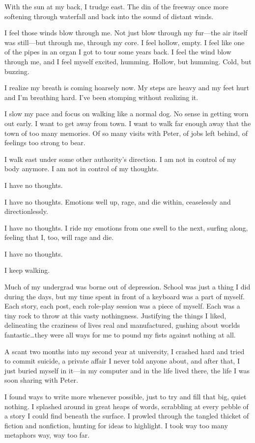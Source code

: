 With the sun at my back, I trudge east. The din of the freeway once more softening through waterfall and back into the sound of distant winds.

I feel those winds blow through me. Not just blow through my fur---the air itself was still---but through me, through my core. I feel hollow, empty. I feel like one of the pipes in an organ I got to tour some years back. I feel the wind blow through me, and I feel myself excited, humming. Hollow, but humming. Cold, but buzzing.

I realize my breath is coming hoarsely now. My steps are heavy and my feet hurt and I'm breathing hard. I've been stomping without realizing it.

I slow my pace and focus on walking like a normal dog. No sense in getting worn out early. I want to get away from town. I want to walk far enough away that the town of too many memories. Of so many visits with Peter, of jobs left behind, of feelings too strong to bear.

I walk east under some other authority's direction. I am not in control of my body anymore. I am not in control of my thoughts.

I have no thoughts.

I have no thoughts. Emotions well up, rage, and die within, ceaselessly and directionlessly.

I have no thoughts. I ride my emotions from one swell to the next, surfing along, feeling that I, too, will rage and die.

I have no thoughts.

I keep walking.

\secdiv{}

\noindent Much of my undergrad was borne out of depression. School was just a thing I did during the days, but my time spent in front of a keyboard was a part of myself. Each story, each post, each role-play session was a piece of myself. Each was a tiny rock to throw at this vasty nothingness. Justifying the things I liked, delineating the craziness of lives real and manufactured, gushing about worlds fantastic\ldots{}they were all ways for me to pound my fists against nothing at all.

A scant two months into my second year at university, I crashed hard and tried to commit suicide, a private affair I never told anyone about, and after that, I just buried myself in it---in my computer and in the life lived there, the life I was soon sharing with Peter.

I found ways to write more whenever possible, just to try and fill that big, quiet nothing. I splashed around in great heaps of words, scrabbling at every pebble of a story I could find beneath the surface. I prowled through the tangled thicket of fiction and nonfiction, hunting for ideas to highlight. I took way too many metaphors way, way too far.

